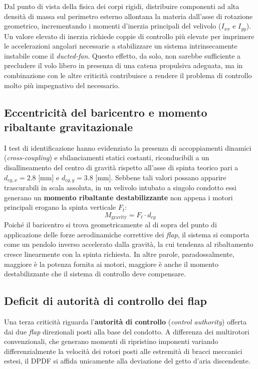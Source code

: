 \documentclass[11pt]{report}
\begin{document}
	Dal punto di vista della fisica dei corpi rigidi, distribuire componenti ad alta densità di massa sul perimetro esterno allontana la materia dall'asse di rotazione geometrico, incrementando i momenti d'inerzia principali del velivolo ($I_{xx}$ e $I_{yy}$). Un valore elevato di inerzia richiede coppie di controllo più elevate per imprimere le accelerazioni angolari necessarie a stabilizzare un sistema intrinsecamente instabile come il \textit{ducted-fan}. Questo effetto, da solo, non sarebbe sufficiente a precludere il volo libero in presenza di una catena propulsiva adeguata, ma in combinazione con le altre criticità contribuisce a rendere il problema di controllo molto più impegnativo del necessario.
	
	\subsection{Eccentricità del baricentro e momento ribaltante gravitazionale}
	\label{sec:eccentricita_cg}
	I test di identificazione hanno evidenziato la presenza di accoppiamenti dinamici (\textit{cross-coupling}) e sbilanciamenti statici costanti, riconducibili a un disallineamento del centro di gravità rispetto all'asse di spinta teorico pari a $d_{cg,x} = 2.8$ [mm] e $d_{cg,y} = 3.8$ [mm]. Sebbene tali valori possano apparire trascurabili in scala assoluta, in un velivolo intubato a singolo condotto essi generano un \textbf{momento ribaltante destabilizzante} non appena i motori principali erogano la spinta verticale $F_t$:
	\begin{equation}
		M_\text{gravity} = F_t \cdot d_{cg}
		\label{eq:momento_gravity}
	\end{equation}
	Poiché il baricentro si trova geometricamente al di sopra del punto di applicazione delle forze aerodinamiche correttive dei \textit{flap}, il sistema si comporta come un pendolo inverso accelerato dalla gravità, la cui tendenza al ribaltamento cresce linearmente con la spinta richiesta. In altre parole, paradossalmente, maggiore è la potenza fornita ai motori, maggiore è anche il momento destabilizzante che il sistema di controllo deve compensare.
	
	\subsection{Deficit di autorità di controllo dei flap}
	\label{sec:autorita_controllo}
	Una terza criticità riguarda l'\textbf{autorità di controllo} (\textit{control authority}) offerta dai due \textit{flap} direzionali posti alla base del condotto. A differenza dei multirotori convenzionali, che generano momenti di ripristino imponenti variando differenzialmente la velocità dei rotori posti alle estremità di bracci meccanici estesi, il DPDF si affida unicamente alla deviazione del getto d'aria discendente.
	
\end{document}
